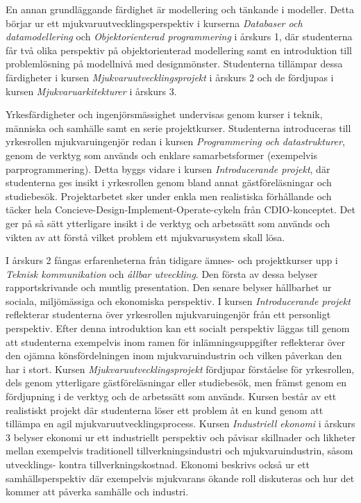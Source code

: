 En annan grundläggande färdighet är modellering och tänkande i modeller. Detta börjar ur ett mjukvaruutvecklingsperspektiv i kurserna \emph{Databaser och datamodellering} och \emph{Objektorienterad programmering} i årskurs 1, där studenterna får två olika perspektiv på objektorienterad modellering samt en introduktion till problemlösning på modellnivå med designmönster. Studenterna tillämpar dessa färdigheter i kursen \emph{Mjukvaruutvecklingsprojekt} i årskurs 2 och de fördjupas i kursen \emph{Mjukvaruarkitekturer} i årskurs 3.

Yrkesfärdigheter och ingenjörsmässighet undervisas genom kurser i teknik, människa och samhälle samt en serie projektkurser. Studenterna introduceras till yrkesrollen mjukvaruingenjör redan i kursen \emph{Programmering och datastrukturer}, genom de verktyg som används och enklare samarbetsformer (exempelvis parprogrammering). Detta byggs vidare i kursen \emph{Introducerande projekt}, där studenterna ges insikt i yrkesrollen genom bland annat gästföreläsningar och studiebesök. Projektarbetet sker under enkla men realistiska förhållande och täcker hela Concieve-Design-Implement-Operate-cykeln från CDIO-konceptet. Det ger på så sätt ytterligare insikt i de verktyg och arbetssätt som används och vikten av att förstå vilket problem ett mjukvarusystem skall lösa.

I årskurs 2 fångas erfarenheterna från tidigare ämnes- och projektkurser upp i \emph{Teknisk kommunikation} och \emph{ållbar utveckling}. Den första av dessa belyser rapportskrivande och muntlig presentation. Den senare belyser hållbarhet ur sociala, miljömässiga och ekonomiska perspektiv. I kursen \emph{Introducerande projekt} reflekterar studenterna över yrkesrollen mjukvaruingenjör från ett personligt perspektiv. Efter denna introduktion kan ett socialt perspektiv läggas till genom att studenterna exempelvis inom ramen för inlämningsuppgifter reflekterar över den ojämna könsfördelningen inom mjukvaruindustrin och vilken påverkan den har i stort. Kursen \emph{Mjukvaruutvecklingsprojekt} fördjupar förståelse för yrkesrollen, dels genom ytterligare gästföreläsningar eller studiebesök, men främst genom en fördjupning i de verktyg och de arbetssätt som används. Kursen består av ett realistiskt projekt där studenterna löser ett problem åt en kund genom att tillämpa en agil mjukvaruutvecklingsprocess. Kursen \emph{Industriell ekonomi} i årskurs 3 belyser ekonomi ur ett industriellt perspektiv och påvisar skillnader och likheter mellan exempelvis traditionell tillverkningsindustri och mjukvaruindustrin, såsom utvecklings- kontra tillverkningskostnad. Ekonomi beskrivs också ur ett samhällsperspektiv där exempelvis mjukvarans ökande roll diskuteras och hur det kommer att påverka samhälle och industri.

